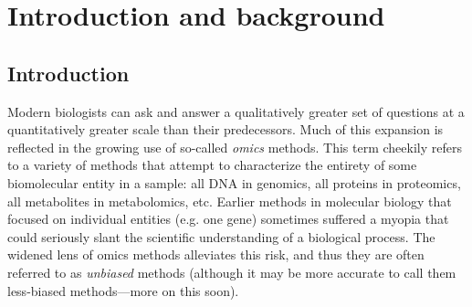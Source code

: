 \documentclass[11pt]{ucthesis}
\begin{document}
%

\part{Introduction and background}

\chapter{Introduction}

\label{chapter:intro}


Modern biologists can ask and answer a qualitatively greater set of questions at a quantitatively greater scale than their predecessors. Much of this expansion is reflected in the growing use of so-called \emph{omics} methods. This term cheekily refers to a variety of methods that attempt to characterize the entirety of some biomolecular entity in a sample: all DNA in genomics, all proteins in proteomics, all metabolites in metabolomics, etc. Earlier methods in molecular biology that focused on individual entities (e.g. one gene) sometimes suffered a myopia that could seriously slant the scientific understanding of a biological process. The widened lens of omics methods alleviates this risk, and thus they are often referred to as \emph{unbiased} methods (although it may be more accurate to call them less-biased methods---more on this soon).
\end{document}
